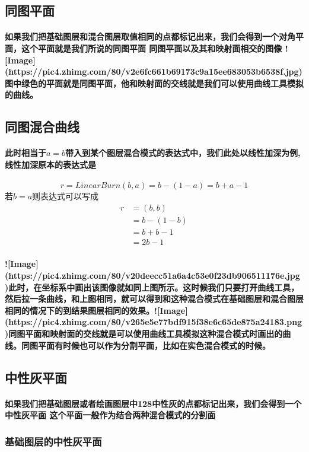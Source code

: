 \subsection{ 同图平面}
\paragraph{如果我们把基础图层和混合图层取值相同的点都标记出来，我们会得到一个对角平面，这个平面就是我们所说的同图平面
	同图平面以及其和映射面相交的图像
	![Image](https://pic4.zhimg.com/80/v2e6fc661b69173c9a15ee683053b6538f.jpg)
	图中绿色的平面就是同图平面，他和映射面的交线就是我们可以使用曲线工具模拟的曲线。}
\subsection{ 同图混合曲线}
\paragraph{此时相当于$a=b$带入到某个图层混合模式的表达式中，我们此处以线性加深为例,线性加深原本的表达式是}
$$r=LinearBurn(b,a)=b-(1-a)=b+a-1$$
若$b=a$则表达式可以写成
$$\begin{aligned} r&=(b,b)\\&=b-(1-b)\\&=b+b-1\\&=2b-1\end{aligned}$$
\paragraph{![Image](https://pic4.zhimg.com/80/v20deecc51a6a4c53e0f23db906511176e.jpg)此时，在坐标系中画出该图像就如同上图所示。这时候我们只要打开曲线工具，然后拉一条曲线，和上图相同，就可以得到和这种混合模式在基础图层和混合图层相同的情况下的到结果图层相同的效果。![Image](https://pic4.zhimg.com/80/v265e5e77bdf915f38e6c65de875a24183.png)同图平面和映射面的交线就是可以使用曲线工具模拟这种混合模式时画出的曲线。同图平面有时候也可以作为分割平面，比如在实色混合模式的时候。}

\subsection{ 中性灰平面}
\paragraph{如果我们把基础图层或者绘画图层中128中性灰的点都标记出来，我们会得到一个中性灰平面
	这个平面一般作为结合两种混合模式的分割面}
\subsubsection{ 基础图层的中性灰平面}
